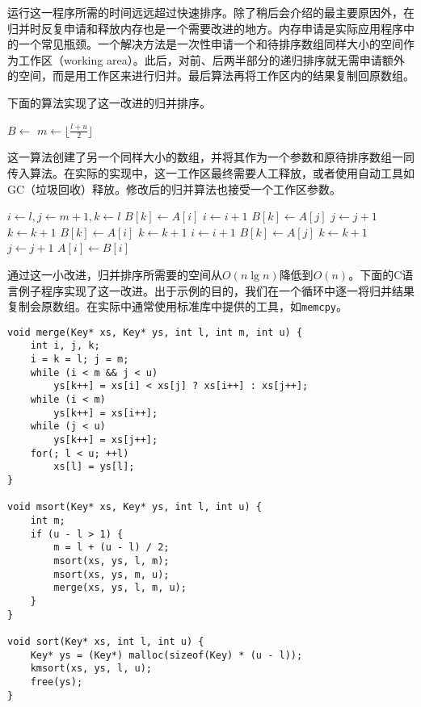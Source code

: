 \documentclass{ctexart}
\begin{document}
运行这一程序所需的时间远远超过快速排序。除了稍后会介绍的最主要原因外，在归并时反复申请和释放内存也是一个需要改进的地方。内存申请是实际应用程序中的一个常见瓶颈\cite{Bentley}。一个解决方法是一次性申请一个和待排序数组同样大小的空间作为工作区（working area）。此后，对前、后两半部分的递归排序就无需申请额外的空间，而是用工作区来进行归并。最后算法再将工作区内的结果复制回原数组。

下面的算法实现了这一改进的归并排序。

\begin{algorithmic}[1]
  \State $B \gets $ 
  \State {}
\EndProcedure
\Statex
{}
    \State $m \gets \lfloor \frac{l + u}{2} \rfloor$
    \State {}
    \State {}
    \State {}
  \EndIf
\EndProcedure
\end{algorithmic}

这一算法创建了另一个同样大小的数组，并将其作为一个参数和原待排序数组一同传入算法。在实际的实现中，这一工作区最终需要人工释放，或者使用自动工具如GC（垃圾回收）释放。修改后的归并算法也接受一个工作区参数。

\begin{algorithmic}[1]
  \State $i \gets l, j \gets m + 1, k \gets l$
      \State $B[k] \gets A[i]$
      \State $i \gets i + 1$
    \Else
      \State $B[k] \gets A[j]$
      \State $j \gets j + 1$
    \EndIf
    \State $k \gets k + 1$
  \EndWhile
    \State $B[k] \gets A[i]$
    \State $k \gets k + 1$
    \State $i \gets i + 1$
  \EndWhile
    \State $B[k] \gets A[j]$
    \State $k \gets k + 1$
    \State $j \gets j + 1$
  \EndWhile
   
    \State $A[i] \gets B[i]$
  \EndFor
\EndProcedure
\end{algorithmic}

通过这一小改进，归并排序所需要的空间从$O(n \lg n)$降低到$O(n)$。下面的C语言例子程序实现了这一改进。出于示例的目的，我们在一个循环中逐一将归并结果复制会原数组。在实际中通常使用标准库中提供的工具，如\texttt{memcpy}。

\lstset{language=C}
\begin{lstlisting}
void merge(Key* xs, Key* ys, int l, int m, int u) {
    int i, j, k;
    i = k = l; j = m;
    while (i < m && j < u)
        ys[k++] = xs[i] < xs[j] ? xs[i++] : xs[j++];
    while (i < m)
        ys[k++] = xs[i++];
    while (j < u)
        ys[k++] = xs[j++];
    for(; l < u; ++l)
        xs[l] = ys[l];
}

void msort(Key* xs, Key* ys, int l, int u) {
    int m;
    if (u - l > 1) {
        m = l + (u - l) / 2;
        msort(xs, ys, l, m);
        msort(xs, ys, m, u);
        merge(xs, ys, l, m, u);
    }
}

void sort(Key* xs, int l, int u) {
    Key* ys = (Key*) malloc(sizeof(Key) * (u - l));
    kmsort(xs, ys, l, u);
    free(ys);
}
\end{lstlisting}
\end{document}
